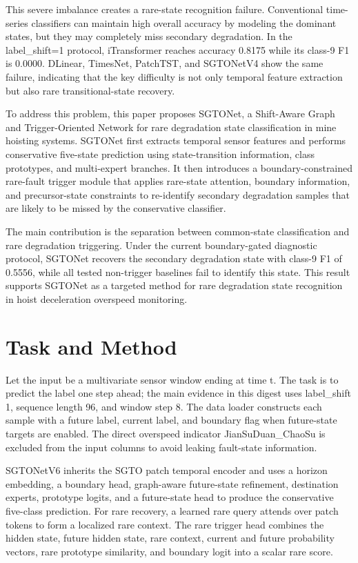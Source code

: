 \documentclass[12pt]{article}
\begin{document}
This severe imbalance creates a rare-state recognition failure. Conventional time-series classifiers can maintain high overall accuracy by modeling the dominant states, but they may completely miss secondary degradation. In the label\_shift=1 protocol, iTransformer reaches accuracy 0.8175 while its class-9 F1 is 0.0000. DLinear, TimesNet, PatchTST, and SGTONetV4 show the same failure, indicating that the key difficulty is not only temporal feature extraction but also rare transitional-state recovery.

To address this problem, this paper proposes SGTONet, a Shift-Aware Graph and Trigger-Oriented Network for rare degradation state classification in mine hoisting systems. SGTONet first extracts temporal sensor features and performs conservative five-state prediction using state-transition information, class prototypes, and multi-expert branches. It then introduces a boundary-constrained rare-fault trigger module that applies rare-state attention, boundary information, and precursor-state constraints to re-identify secondary degradation samples that are likely to be missed by the conservative classifier.

The main contribution is the separation between common-state classification and rare degradation triggering. Under the current boundary-gated diagnostic protocol, SGTONet recovers the secondary degradation state with class-9 F1 of 0.5556, while all tested non-trigger baselines fail to identify this state. This result supports SGTONet as a targeted method for rare degradation state recognition in hoist deceleration overspeed monitoring.

\section{Task and Method}
Let the input be a multivariate sensor window ending at time t. The task is to predict the label one step ahead; the main evidence in this digest uses label\_shift 1, sequence length 96, and window step 8. The data loader constructs each sample with a future label, current label, and boundary flag when future-state targets are enabled. The direct overspeed indicator JianSuDuan\_ChaoSu is excluded from the input columns to avoid leaking fault-state information.

SGTONetV6 inherits the SGTO patch temporal encoder and uses a horizon embedding, a boundary head, graph-aware future-state refinement, destination experts, prototype logits, and a future-state head to produce the conservative five-class prediction. For rare recovery, a learned rare query attends over patch tokens to form a localized rare context. The rare trigger head combines the hidden state, future hidden state, rare context, current and future probability vectors, rare prototype similarity, and boundary logit into a scalar rare score.
\end{document}
